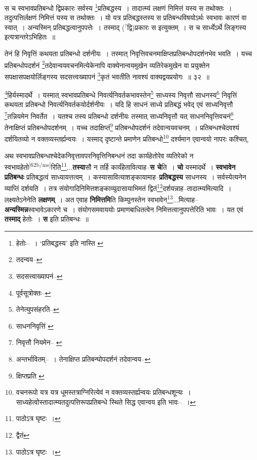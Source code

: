 \documentclass[article,12pt,a4paper]{memoir}
\newcommand{\unclear}[1]{($^{?}$#1)}
\begin{document}
	  \pstart स च स्वभावप्रतिबन्धो द्विप्रकारः सर्वस्य \footnote{हेतोः--\cite{dp-msD-n} । ‘प्रतिबद्धस्य’ इति नास्ति \cite{dp-msA} \cite{dp-edP} \cite{dp-edH}}प्रतिबद्धस्य । तादात्म्यं लक्षणं निमित्तं यस्य स तथोक्तः । तदुत्पत्तिर्लक्षणं निमित्तं यस्य स तथोक्तः । यो यत्र प्रतिबद्धस्तस्य स प्रतिबन्धविषयोऽर्थः स्वभावः कारणं वा स्यात् । अन्यस्मिन् प्रतिबद्धत्वानुपपत्तेः । तस्माद् \unclear{द्वि}प्रकारः स इत्युक्तम् । स च सार्ध्येऽर्थे लिङ्गस्य इत्यत्रान्तरेऽभिहितः ॥
	\pend
       

	  \pstart तेनं हि निवृत्तिं कथयता प्रतिबन्धो दर्शनीयः । तस्मात् निवृत्तिवचनमाक्षिप्तप्रतिबन्धोपदर्शनभेव भवति । यच्च प्रतिबन्धोपदर्शनं \footnote{तदन्वय--\cite{dp-msC}}तदेवान्वयवचनमित्येकेनापि वाक्येनान्वयमुखेन व्यतिरेकमुखेन वा प्रयुक्तेन सपक्षासपक्षयोर्लिङ्गस्य सदसत्त्वख्यापनं \footnote{सदसत्त्वाख्यापनं--\cite{dp-msC}}कृतं भवतीति नावश्यं वाक्यद्वयप्रयोगः ॥ ३२ ॥
	\pend
       

	  \pstart \footnote{पूर्वसूत्रोक्तः--\cite{dp-msD-n}}हिर्यस्मादर्थे । यस्मात् स्वभावप्रतिबन्धे निवर्त्यनिवर्तकभावस्तेन\footnote{तेनेत्युपसंहरति--\cite{dp-msD-n}} साध्यस्य निवृत्तौ साधनस्य\footnote{साधननिवृत्तिं \cite{dp-msC} \cite{dp-msD}} निवृत्तिं कथयता प्रतिबन्धो निवर्त्यनिवर्तकयोर्दर्शनीयः । यदि हि साधनं साध्ये प्रतिबद्धं भवेद् एवं साध्यनिवृत्तौ \footnote{निवृत्तौ नियमेन--\cite{dp-msB} \cite{dp-msC} \cite{dp-msD}}तन्नियमेन निवर्तेत । यतश्च तस्य प्रतिबन्धो दर्शनीयः तस्मात् साध्यनिवृत्तौ यत् साधननिवृत्तिवचनं\footnote{अन्तर्भावितम्--\cite{dp-msD-n} । तेनाक्षिप्त प्रतिबन्घोपदर्शनं तदेवान्वय--\cite{dp-msB}} तेनाक्षिप्तं प्रतिबन्धोपदर्शनम् । यच्च तदाक्षिप्तं\footnote{क्षिप्तप्रति \cite{dp-msA} \cite{dp-edP} \cite{dp-edH} \cite{dp-edE} \cite{dp-edN}} प्रतिबन्धोपदर्शनं तदेवान्वयवचनम् । प्रतिबन्धश्चेदवश्यं दर्शयितव्यो न वक्तव्यस्तर्ह्यन्वयः । यस्माद् दृष्टान्ते प्रमाणेन प्रतिबन्धो\footnote{वचनरूपो यत्र यत्र धूमस्तत्राग्निरित्येवं न वक्तव्यस्तर्ह्यन्वयः प्रतिबन्धशून्यः । साध्यहेत्वोस्तादात्म्यतदुत्पत्तिरूपप्रतिबन्धे स्थिते सिद्ध एवान्वय इति भावः--\cite{dp-msD-n} ।} दर्श्यमान एवान्वयो नापरः कश्चित्,
	\pend
      

	  \pstart अथ स्वभावप्रतिबन्धश्चेदेकनिवृत्तावपरनिवृत्तिनिबन्धनं तदा कार्यहेतोरेव व्यतिरेको न स्वभावहेतो\leavevmode\textsuperscript{\rmlatinfont\tiny [62b/ms]}रिति\footnote{पाठोऽत्र घृष्टः ।}...\textbf{तस्या}सौ न तर्हि कार्यंहेतावित्याह--\textbf{स चे}ति । \textbf{चो} यस्मादर्थे । \textbf{स्वभावेन प्रतिबन्धः} प्रतिबद्धत्वं साध्यायत्तत्वम् । कस्यासावित्याशङ्कायामाह--\textbf{प्रतिबद्धस्य} साधनस्य । सर्वस्येत्यनेन व्याप्तिं दर्शयति । तत्र संयोगादिनिमित्तशङ्काव्युदासायाभिमतं द्वितं\footnote{द्वैतं}दर्शयन्नाह--तादात्म्यमित्यादि । लक्ष्यतेऽनेनेति \textbf{लक्षणम्} । अत एवाह \textbf{निमित्तमि}ति किम्पुनस्तेन स्वभावेन\footnote{पाठोऽत्र घृष्टः ।}...मित्याह--\textbf{अन्यस्मिन्न}स्वभावेऽकारणे च । संयोगसमवाययोः प्रमाणबाधितत्वेन निमित्तत्वानुपपत्तेरिति भावः । यत एवं \textbf{तस्माद्} हेतोः । \textbf{स} इति प्रतिबन्धः ॥
	\pend
      
\end{document}
